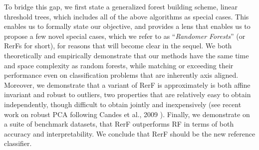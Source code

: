 \documentclass{article} %
\begin{document}
To bridge this gap, we first state a generalized forest building scheme, linear threshold trees, which includes all of the above algorithms as special cases.  This enables us to formally state our objective, and provides a lens that enables us to propose a few novel special cases, which we refer to as ``{\em{Randomer Forests}}''  (or RerFs for short), for reasons that will become clear in the sequel.  We both theoretically and empirically demonstrate that our methods have the same time and space complexity as random forests, while matching or exceeding their performance even on classification problems that are inherently axis aligned.  Moreover, we demonstrate that a variant of RerF is approximately is both affine invariant and robust to outliers, two properties that are relatively easy to obtain independently, though difficult to obtain jointly and inexpensively (see recent work on robust PCA following Candes et al., 2009 \cite{Candes2009}). Finally, we demonstrate on a suite of benchmark datasets, that RerF outperforms RF in terms of both accuracy and interpretability.  We conclude that RerF should be the new reference classifier.




\end{document}
